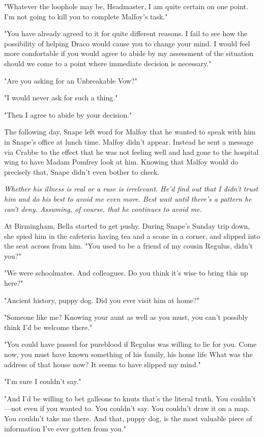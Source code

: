 "Whatever the loophole may be, Headmaster, I am quite certain on one point. I'm not going to kill you to complete Malfoy's task."

"You have already agreed to it for quite different reasons. I fail to see how the possibility of helping Draco would cause you to change your mind. I would feel more comfortable if you would agree to abide by my assessment of the situation should we come to a point where immediate decision is necessary."

"Are you asking for an Unbreakable Vow?"

"I would never ask for such a thing."

"Then I agree to abide by your decision."

The following day, Snape left word for Malfoy that he wanted to speak with him in Snape's office at lunch time. Malfoy didn't appear. Instead he sent a message via Crabbe to the effect that he was not feeling well and had gone to the hospital wing to have Madam Pomfrey look at him. Knowing that Malfoy would do precisely that, Snape didn't even bother to check.

\emph{Whether his illness is real or a ruse is irrelevant. He'd find out that I didn't trust him and do his best to avoid me even more. Best wait until there's a pattern he can't deny. Assuming, of course, that he continues to avoid me.}

At Birmingham, Bella started to get pushy. During Snape's Sunday trip down, she spied him in the cafeteria having tea and a scone in a corner, and slipped into the seat across from him. "You used to be a friend of my cousin Regulus, didn't you?"

"We were schoolmates. And colleagues. Do you think it's wise to bring this up here?"

"Ancient history, puppy dog. Did you ever visit him at home?"

"Someone like me? Knowing your aunt as well as you must, you can't possibly think I'd be welcome there."

"You could have passed for pureblood if Regulus was willing to lie for you. Come now, you must have known something of his family, his home life{\el} What was the address of that house now? It seems to have slipped my mind."

"I'm sure I couldn't say."

"And I'd be willing to bet galleons to knuts that's the literal truth. You couldn't—not even if you wanted to. You couldn't say. You couldn't draw it on a map. You couldn't take me there. And that, puppy dog, is the most valuable piece of information I've ever gotten from you."

